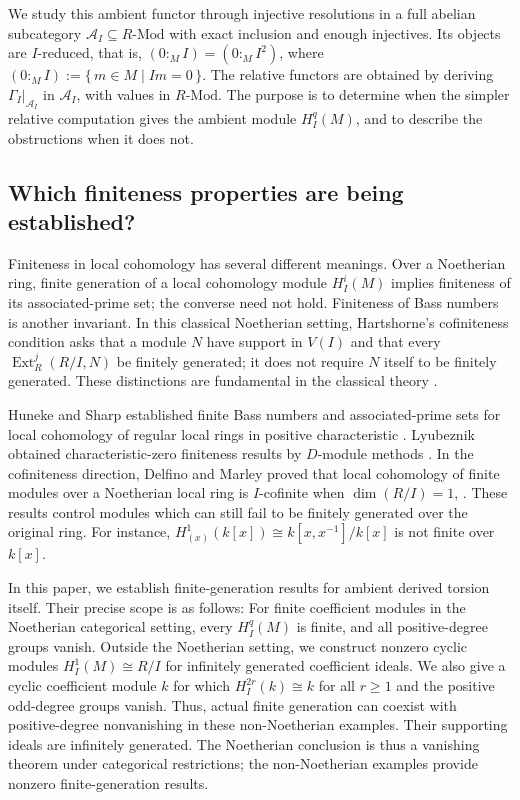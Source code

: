\documentclass[11pt,reqno]{amsart}
\theoremstyle{definition}
\theoremstyle{remark}
\newcommand{\Mod}{\text{-}\mathrm{Mod}}
\newcommand{\Ext}{\operatorname{Ext}}
\newcommand{\A}{\mathcal A_I}
\begin{document}
We study this ambient functor through injective resolutions in a full abelian subcategory $\A\subseteq R\Mod$ with exact inclusion and enough injectives. Its objects are $I$-reduced, that is, $(0:_M I)=(0:_M I^2)$, where \((0:_M I):=\{\,m\in M \mid Im=0\,\}.\) The relative functors are obtained by deriving $\Gamma_I|_{\A}$ in $\A$, with values in $R\Mod$. The purpose is to determine when the simpler relative computation gives the ambient module $H_I^q(M)$, and to describe the obstructions when it does not.

\subsection{Which finiteness properties are being established?}
Finiteness in local cohomology has several different meanings. Over a Noetherian ring, finite generation of a local cohomology module $H_I^i(M)$ implies finiteness of its associated-prime set; the converse need not hold. Finiteness of Bass numbers is another invariant. In this classical Noetherian setting, Hartshorne's cofiniteness condition asks that a module $N$ have support in $V(I)$ and that every $\Ext_R^j(R/I,N)$ be finitely generated; it does not require $N$ itself to be finitely generated. These distinctions are fundamental in the classical theory \cite{BrodmannSharp2013,GrothendieckHartshorne1967,Hartshorne1970,Huneke1992}.

Huneke and Sharp established finite Bass numbers and associated-prime sets for local cohomology of regular local rings in positive characteristic \cite{HunekeSharp1993}. Lyubeznik obtained characteristic-zero finiteness results by $D$-module methods \cite{Lyubeznik1993}. In the cofiniteness direction, Delfino and Marley proved that local cohomology of finite modules over a Noetherian local ring is $I$-cofinite when $\dim(R/I)=1$, \cite{DelfinoMarley1997}. These results control modules which can still fail to be finitely generated over the original ring. For instance, $H_{(x)}^1(k[x])\cong k[x,x^{-1}]/k[x]$ is not finite over $k[x]$.

In this paper, we establish finite-generation results for ambient derived torsion itself. Their precise scope is as follows: For finite coefficient modules in the Noetherian categorical setting, every $H_I^q(M)$ is finite, and all positive-degree groups vanish. Outside the Noetherian setting, we construct nonzero cyclic modules $H_I^1(M)\cong R/I$ for infinitely generated coefficient ideals. We also give a cyclic coefficient module $k$ for which $H_I^{2r}(k)\cong k$ for all $r\geq1$ and the positive odd-degree groups vanish. Thus, actual finite generation can coexist with positive-degree nonvanishing in these non-Noetherian examples. Their supporting ideals are infinitely generated. The Noetherian conclusion is thus a vanishing theorem under categorical restrictions; the non-Noetherian examples provide nonzero finite-generation results.
\end{document}
